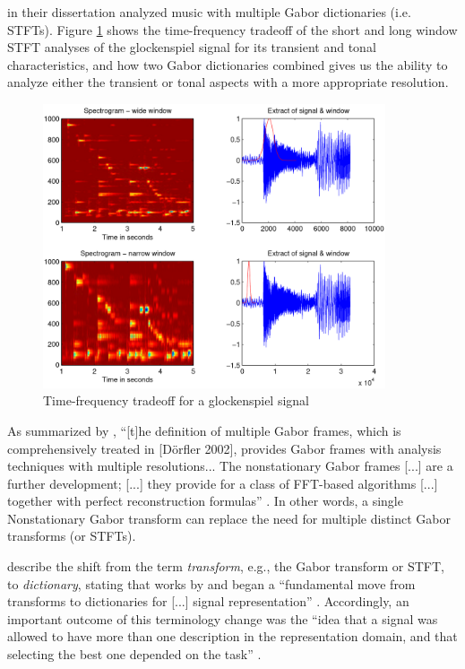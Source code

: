 \documentclass[report.tex]{subfiles}
\begin{document}
\textcite{doerflerphd} in their dissertation analyzed music with multiple Gabor dictionaries (i.e. STFTs). Figure \ref{fig:dorflertradeoff} shows the time-frequency tradeoff of the short and long window STFT analyses of the glockenspiel signal for its transient and tonal characteristics, and how two Gabor dictionaries combined gives us the ability to analyze either the transient or tonal aspects with a more appropriate resolution.

\begin{figure}[ht]
	\centering
	\includegraphics[width=0.9\textwidth]{./images-tftheory/tf_tradeoff_dorfler.png}
	\caption{Time-frequency tradeoff for a glockenspiel signal \parencite[20]{doerflerphd}}
	\label{fig:dorflertradeoff}
\end{figure}

As summarized by \citeauthor{adaptivecqt}, ``[t]he definition of multiple Gabor frames, which is comprehensively treated in [D{\"o}rfler 2002], provides Gabor frames with analysis techniques with multiple resolutions... The nonstationary Gabor frames [...] are a further development; [...] they provide for a class of FFT-based algorithms [...] together with perfect reconstruction formulas'' \parencite[2]{adaptivecqt}. In other words, a single Nonstationary Gabor transform can replace the need for multiple distinct Gabor transforms (or STFTs).

\citeauthor{dictionary} describe the shift from the term \textit{transform}, e.g., the Gabor transform or STFT, to \textit{dictionary}, stating that works by \cite{dictionary1} and \cite{dictionary2} began a ``fundamental move from transforms to dictionaries for [...] signal representation'' \parencite[1,049]{dictionary}. Accordingly, an important outcome of this terminology change was the ``idea that a signal was allowed to have more than one description in the representation domain, and that selecting the best one depended on the task'' \parencite[1,049]{dictionary}.
\end{document}
